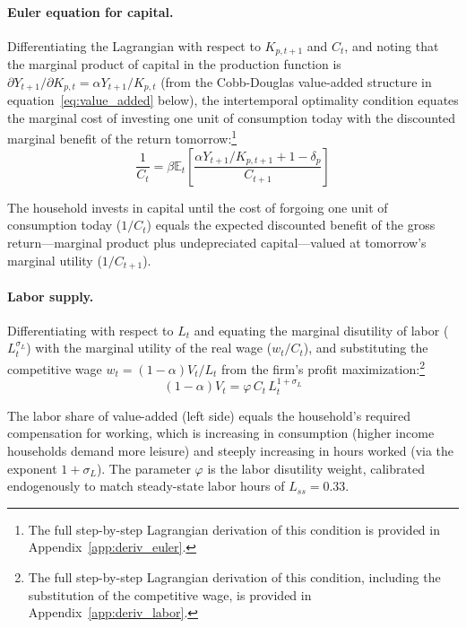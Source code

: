 \documentclass[12pt, a4paper]{article}
\begin{document}
\paragraph{Euler equation for capital.} Differentiating the Lagrangian with respect to $K_{p,t+1}$ and $C_t$, and noting that the marginal product of capital in the production function is $\partial Y_{t+1} / \partial K_{p,t} = \alpha Y_{t+1}/K_{p,t}$ (from the Cobb-Douglas value-added structure in equation~\ref{eq:value_added} below), the intertemporal optimality condition equates the marginal cost of investing one unit of consumption today with the discounted marginal benefit of the return tomorrow:\footnote{The full step-by-step Lagrangian derivation of this condition is provided in Appendix~\ref{app:deriv_euler}.}
\begin{equation}
\frac{1}{C_t} = \beta \mathbb{E}_t \left[ \frac{\alpha Y_{t+1}/K_{p,t+1} + 1 - \delta_p}{C_{t+1}} \right]
\label{eq:euler}
\end{equation}

The household invests in capital until the cost of forgoing one unit of consumption today ($1/C_t$) equals the expected discounted benefit of the gross return---marginal product plus undepreciated capital---valued at tomorrow's marginal utility ($1/C_{t+1}$).

\paragraph{Labor supply.} Differentiating with respect to $L_t$ and equating the marginal disutility of labor ($L_t^{\sigma_L}$) with the marginal utility of the real wage ($w_t/C_t$), and substituting the competitive wage $w_t = (1-\alpha)V_t/L_t$ from the firm's profit maximization:\footnote{The full step-by-step Lagrangian derivation of this condition, including the substitution of the competitive wage, is provided in Appendix~\ref{app:deriv_labor}.}
\begin{equation}
(1-\alpha) V_t = \varphi \, C_t \, L_t^{1+\sigma_L}
\label{eq:labor_supply}
\end{equation}

The labor share of value-added (left side) equals the household's required compensation for working, which is increasing in consumption (higher income households demand more leisure) and steeply increasing in hours worked (via the exponent $1+\sigma_L$). The parameter $\varphi$ is the labor disutility weight, calibrated endogenously to match steady-state labor hours of $L_{ss} = 0.33$.
\end{document}
